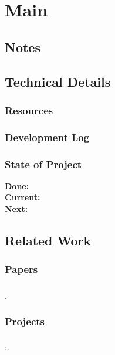 


\maketitle
	
\begin{abstract}
\end{abstract}

\chapter{Main}
\section{Notes}
\section{Technical Details}
\subsection{Resources}
%
\subsection{Development Log}
%
\subsection{State of Project}
\noindent
\textbf{Done:}\\
\textbf{Current:}\\
\textbf{Next:}
%

\section{Related Work}
\subsection{Papers}
\paragraph{}\cite{}.
\subsection{Projects}
\paragraph{}\source{}:.

